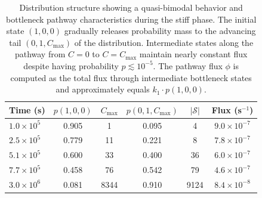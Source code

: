 \documentclass[onefignum,onetabnum]{siamart171218}
\begin{document}
\begin{table}[htbp]
\centering
\caption{Distribution structure showing a quasi-bimodal behavior and bottleneck pathway characteristics during the stiff phase. The initial state $(1,0,0)$ gradually releases probability mass to the advancing tail $(0,1,C_{\max})$ of the distribution. Intermediate states along the pathway from $C=0$ to $C=C_{\max}$ maintain nearly constant flux despite having probability $p \lesssim 10^{-5}$. The pathway flux $\phi$ is computed as the total flux through intermediate bottleneck states and approximately equals $k_1 \cdot p(1,0,0)$.}
\label{tab:bottleneck_diagnostics}
\begin{tabular}{lccccc}
\hline
\textbf{Time (s)} & \textbf{$p(1,0,0)$} & \textbf{$C_{\max}$} & \textbf{$p(0,1,C_{\max})$} & \textbf{$|\mathcal{S}|$} & \textbf{Flux (s$^{-1}$)} \\
\hline
$1.0 \times 10^5$ & 0.905 & 1   & 0.095 & 4     & $9.0 \times 10^{-7}$ \\
$2.5 \times 10^5$ & 0.779 & 11  & 0.221 & 8     & $7.8 \times 10^{-7}$ \\
$5.1 \times 10^5$ & 0.600 & 33  & 0.400 & 36    & $6.0 \times 10^{-7}$ \\
$7.7 \times 10^5$ & 0.458 & 76  & 0.542 & 79    & $4.6 \times 10^{-7}$ \\
$3.0 \times 10^6$ & 0.081 & 8344 & 0.910 & 9124  & $8.4 \times 10^{-8}$ \\
\hline
\end{tabular}
\end{table}
\end{document}
